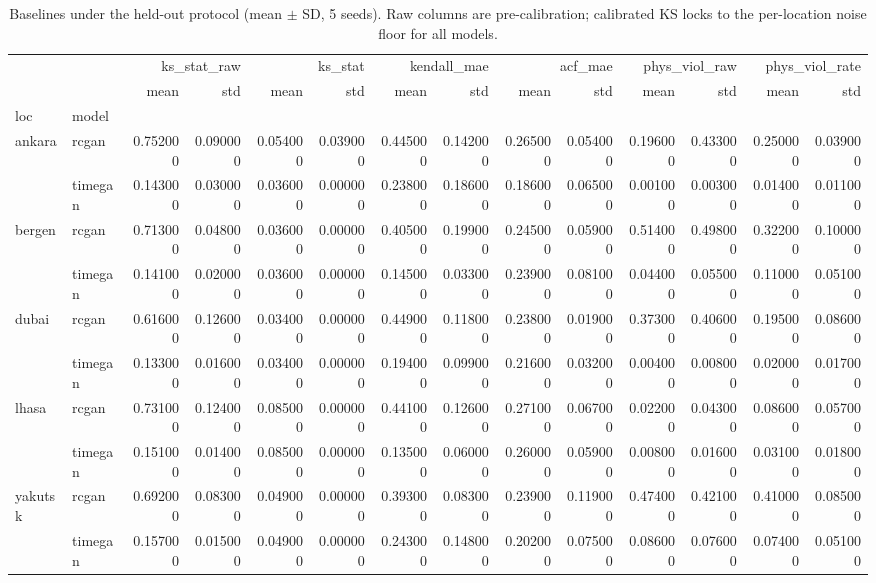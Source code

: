 \begin{table}
\caption{Baselines under the held-out protocol (mean $\pm$ SD, 5 seeds). Raw columns are pre-calibration; calibrated KS locks to the per-location noise floor for all models.}
\label{tab:baselines_v2}
\begin{tabular}{llrrrrrrrrrrrr}
\toprule
 &  & \multicolumn{2}{r}{ks\_stat\_raw} & \multicolumn{2}{r}{ks\_stat} & \multicolumn{2}{r}{kendall\_mae} & \multicolumn{2}{r}{acf\_mae} & \multicolumn{2}{r}{phys\_viol\_raw} & \multicolumn{2}{r}{phys\_viol\_rate} \\
 &  & mean & std & mean & std & mean & std & mean & std & mean & std & mean & std \\
loc & model &  &  &  &  &  &  &  &  &  &  &  &  \\
\midrule
\multirow[t]{2}{*}{ankara} & rcgan & 0.752000 & 0.090000 & 0.054000 & 0.039000 & 0.445000 & 0.142000 & 0.265000 & 0.054000 & 0.196000 & 0.433000 & 0.250000 & 0.039000 \\
 & timegan & 0.143000 & 0.030000 & 0.036000 & 0.000000 & 0.238000 & 0.186000 & 0.186000 & 0.065000 & 0.001000 & 0.003000 & 0.014000 & 0.011000 \\
\cline{1-14}
\multirow[t]{2}{*}{bergen} & rcgan & 0.713000 & 0.048000 & 0.036000 & 0.000000 & 0.405000 & 0.199000 & 0.245000 & 0.059000 & 0.514000 & 0.498000 & 0.322000 & 0.100000 \\
 & timegan & 0.141000 & 0.020000 & 0.036000 & 0.000000 & 0.145000 & 0.033000 & 0.239000 & 0.081000 & 0.044000 & 0.055000 & 0.110000 & 0.051000 \\
\cline{1-14}
\multirow[t]{2}{*}{dubai} & rcgan & 0.616000 & 0.126000 & 0.034000 & 0.000000 & 0.449000 & 0.118000 & 0.238000 & 0.019000 & 0.373000 & 0.406000 & 0.195000 & 0.086000 \\
 & timegan & 0.133000 & 0.016000 & 0.034000 & 0.000000 & 0.194000 & 0.099000 & 0.216000 & 0.032000 & 0.004000 & 0.008000 & 0.020000 & 0.017000 \\
\cline{1-14}
\multirow[t]{2}{*}{lhasa} & rcgan & 0.731000 & 0.124000 & 0.085000 & 0.000000 & 0.441000 & 0.126000 & 0.271000 & 0.067000 & 0.022000 & 0.043000 & 0.086000 & 0.057000 \\
 & timegan & 0.151000 & 0.014000 & 0.085000 & 0.000000 & 0.135000 & 0.060000 & 0.260000 & 0.059000 & 0.008000 & 0.016000 & 0.031000 & 0.018000 \\
\cline{1-14}
\multirow[t]{2}{*}{yakutsk} & rcgan & 0.692000 & 0.083000 & 0.049000 & 0.000000 & 0.393000 & 0.083000 & 0.239000 & 0.119000 & 0.474000 & 0.421000 & 0.410000 & 0.085000 \\
 & timegan & 0.157000 & 0.015000 & 0.049000 & 0.000000 & 0.243000 & 0.148000 & 0.202000 & 0.075000 & 0.086000 & 0.076000 & 0.074000 & 0.051000 \\
\cline{1-14}
\bottomrule
\end{tabular}
\end{table}

